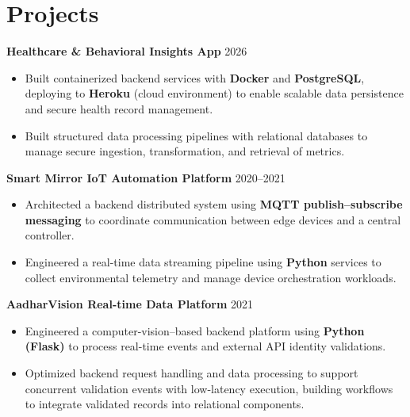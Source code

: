 \documentclass[letterpaper,11pt]{article}
\begin{document}
\section*{Projects}
\textbf{Healthcare \& Behavioral Insights App} \hfill 2026
\begin{itemize}
\item Built containerized backend services with \textbf{Docker} and \textbf{PostgreSQL}, deploying to \textbf{Heroku} (cloud environment) to enable scalable data persistence and secure health record management.
\item Built structured data processing pipelines with relational databases to manage secure ingestion, transformation, and retrieval of metrics.
\end{itemize}

\textbf{Smart Mirror IoT Automation Platform} \hfill 2020--2021
\begin{itemize}
\item Architected a backend distributed system using \textbf{MQTT publish–subscribe messaging} to coordinate communication between edge devices and a central controller.
\item Engineered a real-time data streaming pipeline using \textbf{Python} services to collect environmental telemetry and manage device orchestration workloads.
\end{itemize}

\textbf{AadharVision Real-time Data Platform} \hfill 2021
\begin{itemize}
\item Engineered a computer-vision–based backend platform using \textbf{Python (Flask)} to process real-time events and external API identity validations.
\item Optimized backend request handling and data processing to support concurrent validation events with low-latency execution, building workflows to integrate validated records into relational components.
\end{itemize}
\end{document}
